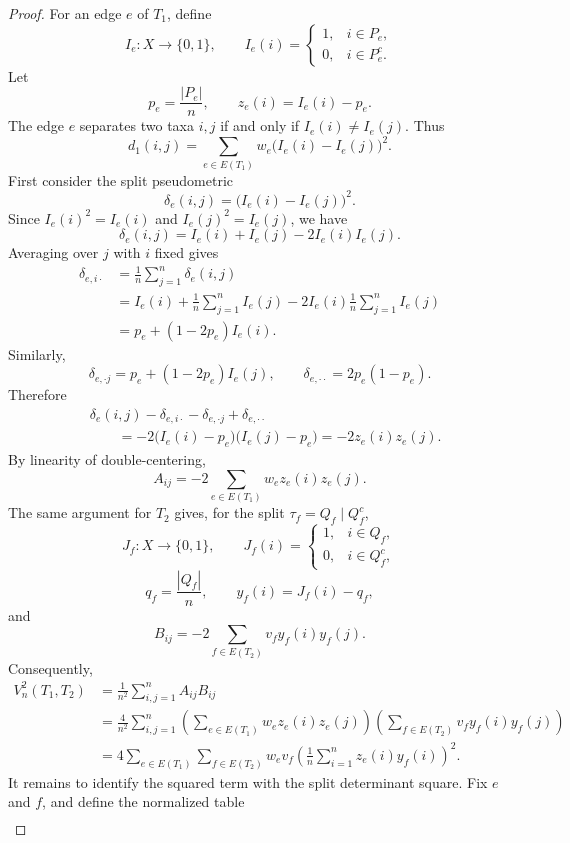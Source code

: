 \documentclass[11pt]{article}
\begin{document}
\begin{proof}
For an edge $e$ of $T_1$, define
\[
I_e:X\to\{0,1\},\qquad
I_e(i)=
\begin{cases}
1,& i\in P_e,\\
0,& i\in P_e^c.
\end{cases}
\]
Let
\[
p_e=\frac{|P_e|}{n},\qquad z_e(i)=I_e(i)-p_e.
\]
The edge $e$ separates two taxa $i,j$ if and only if
$I_e(i)\ne I_e(j)$.  Thus
\[
d_1(i,j)=\sum_{e\in E(T_1)}w_e\bigl(I_e(i)-I_e(j)\bigr)^2.
\]
First consider the split pseudometric
\[
\delta_e(i,j)=\bigl(I_e(i)-I_e(j)\bigr)^2.
\]
Since $I_e(i)^2=I_e(i)$ and $I_e(j)^2=I_e(j)$, we have
\[
\delta_e(i,j)=I_e(i)+I_e(j)-2I_e(i)I_e(j).
\]
Averaging over $j$ with $i$ fixed gives
\[
\begin{aligned}
\delta_{e,i\cdot}
&=\frac1n\sum_{j=1}^n\delta_e(i,j)\\
&=I_e(i)+\frac1n\sum_{j=1}^n I_e(j)
-2I_e(i)\frac1n\sum_{j=1}^nI_e(j)\\
&=p_e+(1-2p_e)I_e(i).
\end{aligned}
\]
Similarly,
\[
\delta_{e,\cdot j}=p_e+(1-2p_e)I_e(j),
\qquad
\delta_{e,\cdot\cdot}=2p_e(1-p_e).
\]
Therefore
\[
\begin{aligned}
&\delta_e(i,j)-\delta_{e,i\cdot}-\delta_{e,\cdot j}+\delta_{e,\cdot\cdot}\\
&\qquad =-2\bigl(I_e(i)-p_e\bigr)\bigl(I_e(j)-p_e\bigr)
=-2z_e(i)z_e(j).
\end{aligned}
\]
By linearity of double-centering,
\[
A_{ij}=-2\sum_{e\in E(T_1)}w_ez_e(i)z_e(j).
\]
The same argument for $T_2$ gives, for the split $\tau_f=Q_f\mid Q_f^c$,
\[
J_f:X\to\{0,1\},\qquad
J_f(i)=
\begin{cases}
1,& i\in Q_f,\\
0,& i\in Q_f^c,
\end{cases}
\]
\[
q_f=\frac{|Q_f|}{n},\qquad y_f(i)=J_f(i)-q_f,
\]
and
\[
B_{ij}=-2\sum_{f\in E(T_2)}v_fy_f(i)y_f(j).
\]
Consequently,
\[
\begin{aligned}
V_n^2(T_1,T_2)
&=\frac1{n^2}\sum_{i,j=1}^nA_{ij}B_{ij}\\
&=\frac4{n^2}\sum_{i,j=1}^n
\left(\sum_{e\in E(T_1)}w_ez_e(i)z_e(j)\right)
\left(\sum_{f\in E(T_2)}v_fy_f(i)y_f(j)\right)\\
&=4\sum_{e\in E(T_1)}\sum_{f\in E(T_2)}w_ev_f
\left(\frac1n\sum_{i=1}^nz_e(i)y_f(i)\right)^2.
\end{aligned}
\]
It remains to identify the squared term with the split determinant square.  Fix $e$ and $f$, and define the normalized table
\[
\begin{array}{c|cc}

\end{array}\]
\end{proof}
\end{document}

